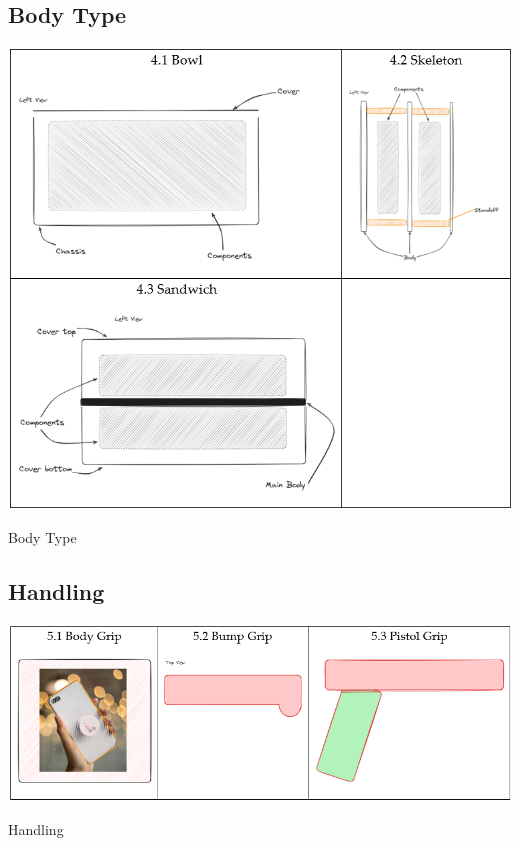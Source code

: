\subsection{Body Type}
\begin{table}[H]
    \centering
    \includegraphics[width=\linewidth]{texs/Part1/chapter3/image/s4.png}
    \caption{Body Type}
    \label{tab:body-type}
\end{table}

\subsection{Handling}
\begin{table}[H]
    \centering
    \includegraphics[width=\linewidth]{texs/Part1/chapter3/image/s5.png}
    \caption{Handling}
    \label{tab:handling}
\end{table}


